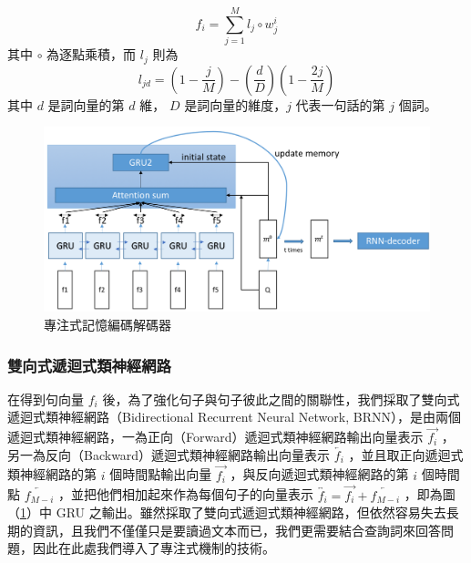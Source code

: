 \begin{equation}
    f_i = \sum_{j=1}^M l_j \circ w_j^i
\end{equation}
其中 $\circ$ 為逐點乘積，而 $l_j$ 則為
\begin{equation}
    l_{jd} = (1 - \frac{j}{M}) - (\frac{d}{D})(1 - \frac{2j}{M}) \label{PE}
\end{equation}
其中 $d$ 是詞向量的第 $d$ 維， $D$ 是詞向量的維度，$j$ 代表一句話的第 $j$ 個詞。

\begin{figure}[h]
    \centering
    \includegraphics[scale=0.54]{images/chap3_dmn.png}
    \caption{專注式記憶編碼解碼器}\label{fig:dmn}
\end{figure}
\subsubsection{雙向式遞迴式類神經網路}
在得到句向量 $f_i$ 後，為了強化句子與句子彼此之間的關聯性，我們採取了雙向式遞迴式類神經網路（Bidirectional Recurrent Neural Network, BRNN），是由兩個遞迴式類神經網路，一為正向（Forward）遞迴式類神經網路輸出向量表示 $\overrightarrow{f_i}$ ，另一為反向（Backward）遞迴式類神經網路輸出向量表示 $\overleftarrow{f_i}$ ，並且取正向遞迴式類神經網路的第 $i$ 個時間點輸出向量 $\overrightarrow{f_i}$ ，與反向遞迴式類神經網路的第 $i$ 個時間點 $\overleftarrow{f_{M-i}}$ ，並把他們相加起來作為每個句子的向量表示 $\overleftrightarrow{f_i} = \overrightarrow{f_i} + \overleftarrow{f_{M-i}}$ ，即為圖（\ref{fig:dmn}）中 GRU 之輸出。雖然採取了雙向式遞迴式類神經網路，但依然容易失去長期的資訊，且我們不僅僅只是要讀過文本而已，我們更需要結合查詢詞來回答問題，因此在此處我們導入了專注式機制的技術。

